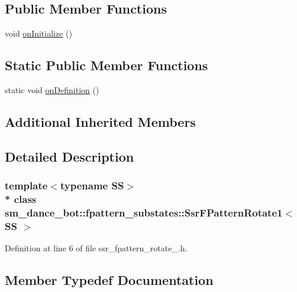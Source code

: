 \subsection*{Public Member Functions}
\begin{DoxyCompactItemize}
\item 
void \hyperlink{structsm__dance__bot_1_1fpattern__substates_1_1SsrFPatternRotate1_a6079fc0a51f4db373ec88b77803e1cc0}{on\+Initialize} ()
\end{DoxyCompactItemize}
\subsection*{Static Public Member Functions}
\begin{DoxyCompactItemize}
\item 
static void \hyperlink{structsm__dance__bot_1_1fpattern__substates_1_1SsrFPatternRotate1_ac172cba89c81bf98a1314a2661effe3b}{on\+Definition} ()
\end{DoxyCompactItemize}
\subsection*{Additional Inherited Members}


\subsection{Detailed Description}
\subsubsection*{template$<$typename SS$>$\\*
class sm\+\_\+dance\+\_\+bot\+::fpattern\+\_\+substates\+::\+Ssr\+F\+Pattern\+Rotate1$<$ S\+S $>$}



Definition at line 6 of file ssr\+\_\+fpattern\+\_\+rotate\+\_.\+h.



\subsection{Member Typedef Documentation}
